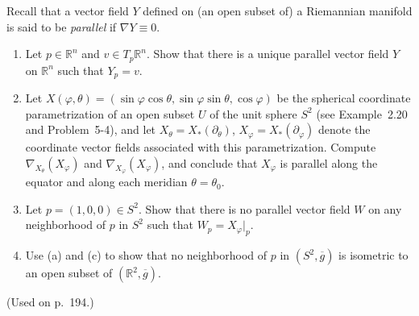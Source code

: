 \begin{exercise}
\label{prob:parallel-vector-fields}

Recall that a vector field $Y$ defined on (an open subset of) a Riemannian manifold is said to be \emph{parallel} if $\nabla Y \equiv 0$.
\begin{enumerate}
\item[(a)] Let $p \in \mathbb{R}^n$ and $v \in T_p \mathbb{R}^n$. Show that there is a unique parallel vector field $Y$ on $\mathbb{R}^n$ such that $Y_p = v$.
\item[(b)] Let $X(\varphi, \theta) = (\sin \varphi \cos \theta, \sin \varphi \sin \theta, \cos \varphi)$ be the spherical coordinate parametrization of an open subset $U$ of the unit sphere $S^2$ (see Example~2.20 and Problem~5-4), and let $X_\theta = X_*(\partial_\theta)$, $X_\varphi = X_*(\partial_\varphi)$ denote the coordinate vector fields associated with this parametrization. Compute $\nabla_{X_\theta}(X_\varphi)$ and $\nabla_{X_\varphi}(X_\varphi)$, and conclude that $X_\varphi$ is parallel along the equator and along each meridian $\theta = \theta_0$.
\item[(c)] Let $p = (1, 0, 0) \in S^2$. Show that there is no parallel vector field $W$ on any neighborhood of $p$ in $S^2$ such that $W_p = X_\varphi|_p$.
\item[(d)] Use (a) and (c) to show that no neighborhood of $p$ in $(S^2, \overline{g})$ is isometric to an open subset of $(\mathbb{R}^2, \overline{g})$.
\end{enumerate}
(Used on p.\ 194.)
\end{exercise}

